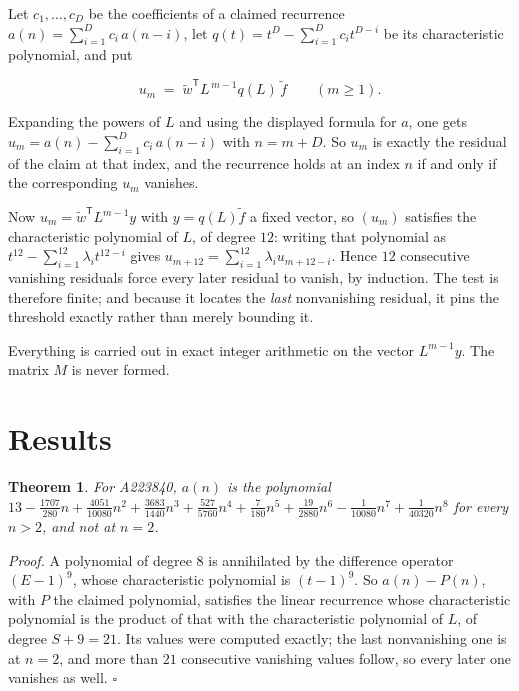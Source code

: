 \documentclass[11pt]{article}
\newtheorem{theorem}{Theorem}
\theoremstyle{definition}
\begin{document}
Let $c_1,\dots,c_D$ be the coefficients of a claimed recurrence $a(n) = \sum_{i=1}^{D} c_i\,a(n-i)$, let $q(t) = t^{D} - \sum_{i=1}^{D} c_i t^{D-i}$ be its characteristic polynomial, and put

\[u_m \;=\; \tilde w^{\mathsf T} L^{\,m-1} q(L)\,\tilde f \qquad (m \ge 1).\]

Expanding the powers of $L$ and using the displayed formula for $a$, one gets $u_m = a(n) - \sum_{i=1}^{D} c_i\,a(n-i)$ with $n = m + D$. So $u_m$ is exactly the residual of the claim at that index, and the recurrence holds at an index $n$ if and only if the corresponding $u_m$ vanishes.

Now $u_m = \tilde w^{\mathsf T} L^{m-1} y$ with $y = q(L)\tilde f$ a fixed vector, so $(u_m)$ satisfies the characteristic polynomial of $L$, of degree $12$: writing that polynomial as $t^{12} - \sum_{i=1}^{12} \lambda_i t^{12-i}$ gives $u_{m+12} = \sum_{i=1}^{12} \lambda_i u_{m+12-i}$. Hence $12$ consecutive vanishing residuals force every later residual to vanish, by induction. The test is therefore finite; and because it locates the {\itshape last} nonvanishing residual, it pins the threshold exactly rather than merely bounding it.

Everything is carried out in exact integer arithmetic on the vector $L^{m-1}y$. The matrix $M$ is never formed.

\section{Results}

\begin{theorem} For A223840, $a(n)$ is the polynomial $13 - \frac{1707}{280}n + \frac{4051}{10080}n^{2} + \frac{3683}{1440}n^{3} + \frac{527}{5760}n^{4} + \frac{7}{180}n^{5} + \frac{19}{2880}n^{6} - \frac{1}{10080}n^{7} + \frac{1}{40320}n^{8}$ for every $n > 2$, and not at $n = 2$.\end{theorem}

{\itshape Proof.} A polynomial of degree $8$ is annihilated by the difference operator $(E-1)^{9}$, whose characteristic polynomial is $(t-1)^{9}$. So $a(n) - P(n)$, with $P$ the claimed polynomial, satisfies the linear recurrence whose characteristic polynomial is the product of that with the characteristic polynomial of $L$, of degree $S + 9 = 21$. Its values were computed exactly; the last nonvanishing one is at $n = 2$, and more than $21$ consecutive vanishing values follow, so every later one vanishes as well. $\square$
\end{document}
